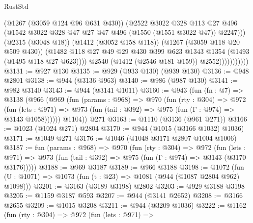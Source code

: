 \begin{lexlean}{RustStd}
\begin{coremodule}
                              (@1267 (@3059 @124 @96 @631 @430))
                              (@2522
                                @3022
                                @328
                                @113
                                @27
                                @496
                                (@1542
                                  @3022
                                  @328
                                  @47
                                  @27
                                  @47
                                  @496
                                  (@1550 (@1551 @3022 @47))
                                  @2247)))
                            (@2315 (@3048 @18))
                            (@1412 (@3052 @158 @118))
                            (@1267 (@3059 @118 @20 @509 @430))
                            (@1482
                              @118
                              @27
                              @49
                              @29
                              @430
                              @399
                              @623
                              @1343
                              @1354
                              (@1493 (@1495 @118 @27 @623))))
                          @2540
                          (@1412 (@2546 @181 @159))
                          @2552)))))))))))
@3131 := @927 @130
@3135 := @929 (@933 @130) (@939 @130)
@3136 := @948 @2801
@3138 := @944 (@3136 @963)
@3140 := @986 (@987 @130)
@3141 := @982 @3140
@3143 := @944 (@3141 @1011)
@3160 := @943
    (fun (fn : @7) =>
    @3138
      (@966
        (@969
          (fun (params : @968) =>
          @970
            (fun (rty : @304) =>
            @972
              (fun (lets : @971) =>
              @973 (fun (tail : @392) => @975 (fun (Γ : @974) => @3143 @1058))))))
        @1104))
    @271
@3163 := @1110 (@3136 (@961 @271))
@3166 := @1023 (@1024 @271) @2804
@3170 := @944 (@1015 (@3166 @1032) @1036)
@3171 := @1049 @271
@3176 := @1046 (@1048 @3171 @2807 @1004 @1006)
@3187 := fun (params : @968) =>
  @970
    (fun (rty : @304) =>
    @972
      (fun (lets : @971) =>
      @973 (fun (tail : @392) => @975 (fun (Γ : @974) => @3143 (@3170 @3176)))))
@3188 := @969 @3187
@3189 := @966 @3188
@3198 := @1072 (fun (U : @1071) => @1073 (fun (t : @23) => @1081 (@944 (@1087 @2804 @962) @1098)))
@3201 := @3163 (@3189 @3198) @2802
@3203 := @929 @3188 @3198
@3205 := @1159 @3187 @593
@3207 := @944 (@3141 @2652)
@3208 := @3166 @2655
@3209 := @1015 @3208
@3211 := @944 (@3209 @1036)
@3222 := @1162
    (fun (rty : @304) =>
    @972
      (fun (lets : @971) =>

\end{coremodule}
\end{lexlean}
